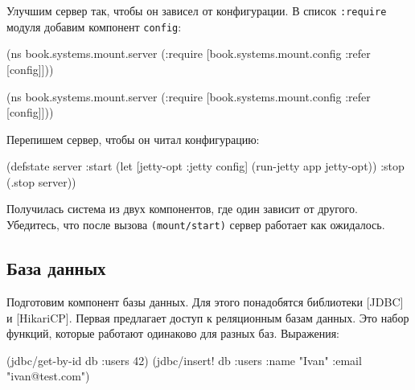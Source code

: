 
Улучшим сервер так, чтобы он зависел от конфигурации. В список \verb|:require|
модуля добавим компонент \verb|config|:

\ifnarrow

\begin{english}
  \begin{clojure}
(ns book.systems.mount.server
 (:require
  [book.systems.mount.config
   :refer [config]]))
  \end{clojure}
\end{english}

\else

\begin{english}
  \begin{clojure}
(ns book.systems.mount.server
 (:require
  [book.systems.mount.config :refer [config]]))
  \end{clojure}
\end{english}

\fi

\noindent
Перепишем сервер, чтобы он читал конфигурацию:

\begin{english}
  \begin{clojure}
(defstate server
  :start
  (let [{jetty-opt :jetty} config]
    (run-jetty app jetty-opt))
  :stop
  (.stop server))
  \end{clojure}
\end{english}

Получилась система из двух компонентов, где один зависит от другого. Убедитесь,
что после вызова \verb|(mount/start)| сервер работает как ожидалось.

\subsection{База данных}


Подготовим компонент базы данных. Для этого понадобятся библиотеки
[JDBC] и
[HikariCP].
Первая предлагает доступ к реляционным базам данных. Это набор функций, которые
работают одинаково для разных баз. Выражения:

\begin{english}
  \begin{clojure}
(jdbc/get-by-id db :users 42)
(jdbc/insert! db :users
   {:name "Ivan" :email "ivan@test.com"})
  \end{clojure}
\end{english}

